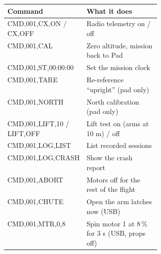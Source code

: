\documentclass[11pt,a4paper,oneside]{article}
\begin{document}
\renewcommand{\arraystretch}{1.25}
\begin{tabularx}{\linewidth}{@{}>{\ttfamily\raggedright\arraybackslash}p{0.36\linewidth}L@{}}
\toprule
\textrm{\textbf{Command}} & \textbf{What it does} \\ \midrule
CMD,001,CX,ON / CX,OFF & Radio telemetry on / off \\
CMD,001,CAL & Zero altitude, mission back to Pad \\
CMD,001,ST,00:00:00 & Set the mission clock \\
CMD,001,TARE & Re-reference ``upright'' (pad only) \\
CMD,001,NORTH & North calibration (pad only) \\
CMD,001,LIFT,10 / LIFT,OFF & Lift test on (arms at 10 m) / off \\
CMD,001,LOG,LIST & List recorded sessions \\
CMD,001,LOG,CRASH & Show the crash report \\
CMD,001,ABORT & Motors off for the rest of the flight \\
CMD,001,CHUTE & Open the arm latches now (USB) \\
CMD,001,MTR,0,8 & Spin motor 1 at 8\,\% for 3 s (USB, props off) \\
\bottomrule
\end{tabularx}
\end{document}
